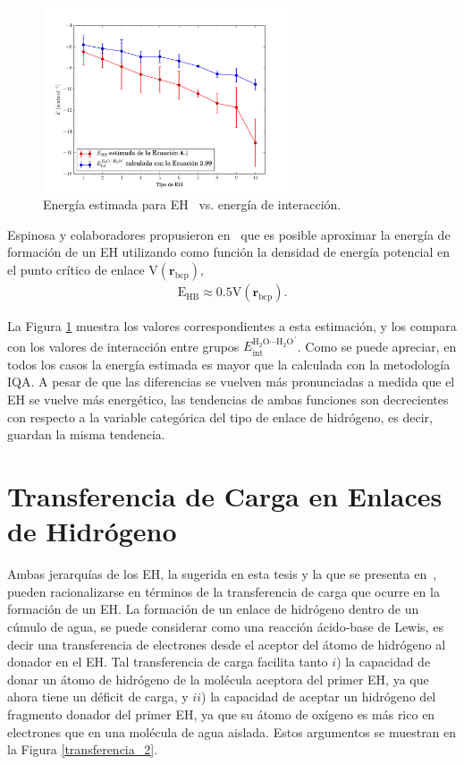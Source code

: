 \begin{figure}
    \centering
    \includegraphics[width=0.65\textwidth]{4/img/EHB_vs_Eint}
    \caption{Energía estimada para EH~\cite{Espinosa1998} vs. energía de interacción.}
\label{estimada}
\end{figure}

Espinosa y colaboradores propusieron en~ que es posible
aproximar la energía de formación de un EH utilizando como función la densidad
de energía potencial en el punto crítico de enlace
$\mathrm{V(\mathbf{r}_{bcp})}$,
%
\begin{align}
\mathrm{E_{HB}}\approx 0.5\mathrm{V(\mathbf{r}_{bcp})}.
\label{estimada_eq}
\end{align}
%

La Figura \ref{estimada} muestra los valores correspondientes a esta
estimación, y los compara con los valores de interacción entre grupos
${E_{\mathrm{int}}^{\mathrm{H_2O}\cdots\mathrm{H_2O}^{ \, \prime}}}$. Como se
puede apreciar, en todos los casos la energía estimada es mayor que la
calculada con la metodología IQA. A pesar de  que las diferencias se vuelven
más pronunciadas a medida que el EH se vuelve más energético, las tendencias de
ambas funciones son decrecientes con respecto a la variable categórica del tipo
de enlace de hidrógeno, es decir, guardan la misma tendencia.

\section{Transferencia de Carga en Enlaces de Hidrógeno}

Ambas jerarquías de los EH, la sugerida en esta tesis y la que se presenta
en~, pueden racionalizarse en términos de la transferencia
de carga que ocurre en la formación de un EH. La formación de un enlace de
hidrógeno dentro de un cúmulo de agua, se puede considerar como una reacción
ácido-base de Lewis, es decir una transferencia de electrones desde el aceptor
del átomo de hidrógeno al donador en el EH. Tal transferencia de carga facilita
tanto $i$) la capacidad de donar un átomo de hidrógeno de la molécula aceptora
del primer EH, ya que ahora tiene un déficit de carga, y $ii$) la capacidad de
aceptar un hidrógeno del fragmento donador del primer EH, ya que su átomo de
oxígeno es más rico en electrones que en una molécula de agua aislada. Estos
argumentos se muestran en la Figura \ref{transferencia_2}.

